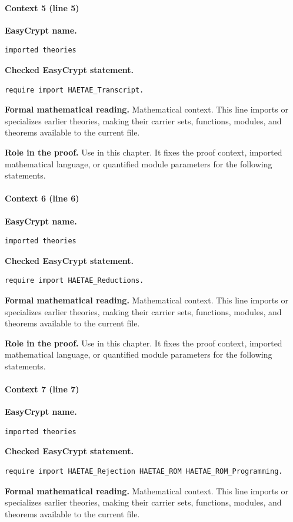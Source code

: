 \paragraph{Context 5 (line 5)}
\noindent\textbf{EasyCrypt name.}
\begin{lstlisting}[language=EasyCrypt,basicstyle=\ttfamily\scriptsize]
imported theories
\end{lstlisting}
\noindent\textbf{Checked EasyCrypt statement.}
\begin{lstlisting}[language=EasyCrypt,basicstyle=\ttfamily\scriptsize]
require import HAETAE_Transcript.
\end{lstlisting}
\noindent\textbf{Formal mathematical reading.}
Mathematical context. This line imports or specializes earlier theories, making their carrier sets, functions, modules, and theorems available to the current file.

\noindent\textbf{Role in the proof.}
Use in this chapter. It fixes the proof context, imported mathematical language, or quantified module parameters for the following statements.

\paragraph{Context 6 (line 6)}
\noindent\textbf{EasyCrypt name.}
\begin{lstlisting}[language=EasyCrypt,basicstyle=\ttfamily\scriptsize]
imported theories
\end{lstlisting}
\noindent\textbf{Checked EasyCrypt statement.}
\begin{lstlisting}[language=EasyCrypt,basicstyle=\ttfamily\scriptsize]
require import HAETAE_Reductions.
\end{lstlisting}
\noindent\textbf{Formal mathematical reading.}
Mathematical context. This line imports or specializes earlier theories, making their carrier sets, functions, modules, and theorems available to the current file.

\noindent\textbf{Role in the proof.}
Use in this chapter. It fixes the proof context, imported mathematical language, or quantified module parameters for the following statements.

\paragraph{Context 7 (line 7)}
\noindent\textbf{EasyCrypt name.}
\begin{lstlisting}[language=EasyCrypt,basicstyle=\ttfamily\scriptsize]
imported theories
\end{lstlisting}
\noindent\textbf{Checked EasyCrypt statement.}
\begin{lstlisting}[language=EasyCrypt,basicstyle=\ttfamily\scriptsize]
require import HAETAE_Rejection HAETAE_ROM HAETAE_ROM_Programming.
\end{lstlisting}
\noindent\textbf{Formal mathematical reading.}
Mathematical context. This line imports or specializes earlier theories, making their carrier sets, functions, modules, and theorems available to the current file.

